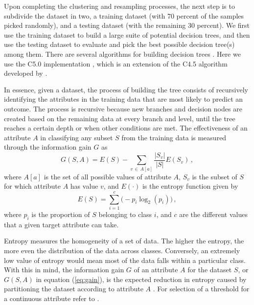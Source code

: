 Upon completing the clustering and resampling processes, the next step is to subdivide the dataset in two, a training dataset (with 70 percent of the samples picked randomly), and a testing dataset (with the remaining 30 percent). We first use the training dataset to build a large suite of potential decision trees, and then use the testing dataset to evaluate and pick the best possible decision tree(s) among them. There are several algorithms for building decision trees \citep[e.g., ID3, C4.5, C5.0, CART; see][]{Quinlan_1986_ML, Quinlan_1993_Book, Quinlan_1996_JAIR, Breiman_1984_Book}. Here we use the C5.0 implementation \citep{Kuhn_2017_Manual}, which is an extension of the C4.5 algorithm developed by \citet{Quinlan_1993_Book, Quinlan_1996_JAIR}.

In essence, given a dataset, the process of building the tree consists of recursively identifying the attributes in the training data that are most likely to predict an outcome. The process is recursive because new branches and decision nodes are created based on the remaining data at every branch and level, until the tree reaches a certain depth or when other conditions are met. The effectiveness of an attribute $A$ in classifying any subset $S$ from the training data is measured through the information gain $G$ as
% 
\begin{equation}
	\label{eq:gain}
	G(S,A) = E(S) - \sum_{v \, \in \, A[a]} \frac{ \left| S_v \right| }{ \left| S \right| } E \left( S_v \right)
	\, ,
\end{equation} 
% 
where $A[a]$ is the set of all possible values of attribute $A$, $S_v$ is the subset of $S$ for which attribute $A$ has value $v$, and $E(\cdot)$ is the entropy function given by
% 
\begin{equation}
	E(S) = \sum_{i=1}^{c} \Big( -p_i \log_2 \left(p_i\right) \Big)
	\, ,
\end{equation}
% 
where $p_i$ is the proportion of $S$ belonging to class $i$, and $c$ are the different values that a given target attribute can take.

Entropy measures the homogeneity of a set of data. The higher the entropy, the more even the distribution of the data across classes. Conversely, an extremely low value of entropy would mean most of the data falls within a particular class. With this in mind, the information gain $G$ of an attribute $A$ for the dataset $S$, or $G(S,A)$ in equation (\ref{eq:gain}), is the expected reduction in entropy caused by partitioning the dataset according to attribute $A$ \citep{Mitchell_1997_Book}. For selection of a threshold for a continuous attribute refer to \citet{Quinlan_1996_JAIR}.

